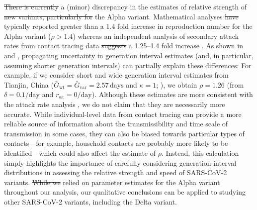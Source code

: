 \documentclass[12pt]{article}
\newcommand{\vvvar}{\mathrm{var}}
\newcommand{\wwwt}{\mathrm{wt}}
\newcommand{\rx}[1]{\ensuremath{{r}_{#1}}\xspace}
\newcommand{\rw}{\rx{\wwwt}}
\newcommand{\days}{\ensuremath{\, \textrm{days}}}
\newcommand{\pday}{\ensuremath{/\textrm{day}}}
\newcommand{\Gx}[1]{\ensuremath{{\bar G}_{#1}}\xspace}
\newcommand{\Gw}{\Gx{\wwwt}}
\newcommand{\Gv}{\Gx{\vvvar}}
\providecommand{\DIFaddtex}[1]{{\protect\color{blue}\uwave{#1}}} %
\providecommand{\DIFdeltex}[1]{{\protect\color{red}\sout{#1}}}                      %
\providecommand{\DIFaddbegin}{} %
\providecommand{\DIFaddend}{} %
\providecommand{\DIFdelbegin}{} %
\providecommand{\DIFdelend}{} %
\providecommand{\DIFadd}[1]{\texorpdfstring{\DIFaddtex{#1}}{#1}} %
\providecommand{\DIFdel}[1]{\texorpdfstring{\DIFdeltex{#1}}{}} %
\newcommand{\DIFscaledelfig}{0.5}
\newlength{\DIFdelgraphicswidth} %
\newlength{\DIFdelgraphicsheight} %
\newcommand{\DIFaddincludegraphics}[2][]{{\color{blue}\fbox{\DIFOincludegraphics[#1]{#2}}}} %
\newcommand{\DIFdelincludegraphics}[2][]{%
\sbox{\DIFdelgraphicsbox}{\DIFOincludegraphics[#1]{#2}}%
\settoboxwidth{\DIFdelgraphicswidth}{\DIFdelgraphicsbox} %
\settoboxtotalheight{\DIFdelgraphicsheight}{\DIFdelgraphicsbox} %
\scalebox{\DIFscaledelfig}{%
\parbox[b]{\DIFdelgraphicswidth}{\usebox{\DIFdelgraphicsbox}\\[-\baselineskip] \rule{\DIFdelgraphicswidth}{0em}}\llap{\resizebox{\DIFdelgraphicswidth}{\DIFdelgraphicsheight}{%
\setlength{\unitlength}{\DIFdelgraphicswidth}%
\begin{picture}(1,1)%
\thicklines\linethickness{2pt} %
{\color[rgb]{1,0,0}\put(0,0){\framebox(1,1){}}}%
{\color[rgb]{1,0,0}\put(0,0){\line( 1,1){1}}}%
{\color[rgb]{1,0,0}\put(0,1){\line(1,-1){1}}}%
\end{picture}%
}\hspace*{3pt}}} %
} %
\DeclareRobustCommand{\DIFaddbegin}{\DIFOaddbegin \let\includegraphics\DIFaddincludegraphics} %
\DeclareRobustCommand{\DIFaddend}{\DIFOaddend \let\includegraphics\DIFOincludegraphics} %
\DeclareRobustCommand{\DIFdelbegin}{\DIFOdelbegin \let\includegraphics\DIFdelincludegraphics} %
\DeclareRobustCommand{\DIFdelend}{\DIFOaddend \let\includegraphics\DIFOincludegraphics} %
\begin{document}
\DIFdel{There is currently }\DIFdelend \DIFaddbegin \DIFadd{There were }\DIFaddend a (minor) discrepancy in the estimates of relative strength of \DIFdelbegin \DIFdel{new variants, particularly for }\DIFdelend the Alpha variant.
Mathematical analyses \DIFdelbegin \DIFdel{have }\DIFdelend typically reported greater than a 1.4 fold increase in reproduction number for the Alpha variant ($\rho > 1.4$) whereas an independent analysis of secondary attack rates from contact tracing data \DIFdelbegin \DIFdel{suggests }\DIFdelend \DIFaddbegin \DIFadd{suggested }\DIFaddend a 1.25--1.4 fold increase \citep{ukinvest}.
As shown in \cite{davies2021estimated} and \cite{volz2021transmission}, propagating uncertainty in generation interval estimates (and, in particular, assuming shorter generation intervals) can partially explain these differences:
For example, if we consider short and wide generation interval estimates from Tianjin, China ($\Gw=\Gv=2.57\days$ and $\kappa=1$; \cite{ganyani2020estimating}), we obtain $\rho=1.26$ (from $\delta=0.1\pday$ and $\rw = 0\pday$).
Although these estimates are more consistent with the attack rate analysis \citep{ukinvest},
we do not claim that they are necessarily more accurate.
While individual-level data from contact tracing can provide a more reliable source of information about the transmissibility and time scale of transmission in some cases, they can also be biased towards particular types of contacts---for example, household contacts are probably more likely to be identified---which could also affect the estimate of $\rho$.
Instead, this calculation simply highlights the importance of carefully considering generation-interval distributions in assessing the relative strength and speed of SARS-CoV-2 variants.
\DIFdelbegin \DIFdel{While we }\DIFdelend \DIFaddbegin \DIFadd{We }\DIFaddend relied on parameter estimates for the Alpha variant throughout our analysis, \DIFaddbegin \DIFadd{but }\DIFaddend our qualitative conclusions can be applied to studying other SARS-CoV-2 variants, including the Delta \DIFaddbegin \DIFadd{and Omicron  }\DIFaddend variant.
\end{document}
